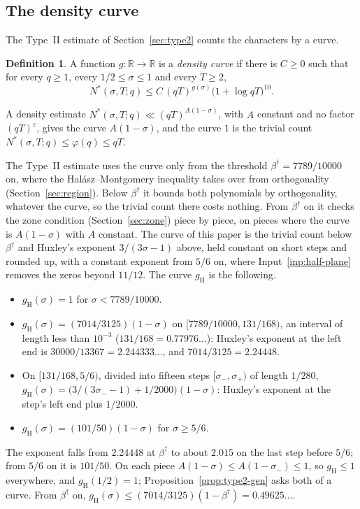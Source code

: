 \documentclass[11pt]{article}
\theoremstyle{definition}
\newtheorem{definition}[theorem]{Definition}
\begin{document}
\subsection*{The density curve}

The Type~II estimate of Section~\ref{sec:type2} counts the characters by a curve.

\begin{definition}\label{def:curve}
A function $g : \mathbb R \to \mathbb R$ is a \emph{density curve} if there is $C \ge 0$ such that for every
$q \ge 1$, every $1/2 \le \sigma \le 1$ and every $T \ge 2$,
\[
  N^*(\sigma, T; q) \le C\, (qT)^{g(\sigma)} \bigl(1 + \log qT\bigr)^{10}.
\]
\end{definition}

A density estimate $N^*(\sigma, T; q) \ll (qT)^{A(1 - \sigma)}$, with $A$ constant and no factor $(qT)^\varepsilon$,
gives the curve $A(1 - \sigma)$, and the curve $1$ is the trivial count $N^*(\sigma, T; q) \le \varphi(q) \le qT$.

The Type~II estimate uses the curve only from the threshold $\beta^\dagger = 7789/10000$ on, where the
Hal\'asz--Montgomery inequality takes over from orthogonality (Section~\ref{sec:region}). Below $\beta^\dagger$ it
bounds both polynomials by orthogonality, whatever the curve, so the trivial count there costs nothing. From
$\beta^\dagger$ on it checks the zone condition (Section~\ref{sec:zone}) piece by piece, on pieces where the curve is
$A(1 - \sigma)$ with $A$ constant. The curve of this paper is the trivial
count below $\beta^\dagger$ and Huxley's exponent $3/(3\sigma - 1)$ above, held constant on short steps and rounded up,
with a
constant exponent from $5/6$ on, where Input~\ref{inp:half-plane} removes the zeros beyond $11/12$. The curve
$g_{\mathrm H}$ is the following.
\begin{itemize}
\item $g_{\mathrm H}(\sigma) = 1$ for $\sigma < 7789/10000$.
\item $g_{\mathrm H}(\sigma) = (7014/3125)(1 - \sigma)$ on $[7789/10000, 131/168)$, an interval of length less than
  $10^{-3}$ ($131/168 = 0.77976\ldots$): Huxley's exponent at the left end
  is $30000/13367 = 2.244333\ldots$, and $7014/3125 = 2.24448$.
\item On $[131/168, 5/6)$, divided into fifteen steps $[\sigma_-, \sigma_+)$ of length $1/280$,
  $g_{\mathrm H}(\sigma) = \bigl(3/(3\sigma_- - 1) + 1/2000\bigr)(1 - \sigma)$: Huxley's exponent at the step's left end
  plus $1/2000$.
\item $g_{\mathrm H}(\sigma) = (101/50)(1 - \sigma)$ for $\sigma \ge 5/6$.
\end{itemize}
The exponent falls from $2.24448$ at $\beta^\dagger$ to about $2.015$ on the last step before $5/6$; from $5/6$ on it is
$101/50$. On each piece $A(1 - \sigma) \le A(1 - \sigma_-) \le 1$, so $g_{\mathrm H} \le 1$ everywhere, and
$g_{\mathrm H}(1/2) = 1$; Proposition~\ref{prop:type2-gen} asks both of a curve. From $\beta^\dagger$ on, $g_{\mathrm
H}(\sigma) \le (7014/3125)(1 - \beta^\dagger) =
0.49625\ldots$.
\end{document}

